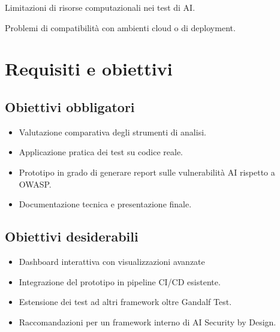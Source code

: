 \begin{risk}{Limitazioni di risorse computazionali nei test di AI.}
\end{risk}

\begin{risk}{Problemi di compatibilità con ambienti cloud o di deployment.}
\end{risk}


\section{Requisiti e obiettivi}


\subsection{Obiettivi obbligatori}
\begin{itemize}
\item Valutazione comparativa degli strumenti di analisi.
\item Applicazione pratica dei test su codice reale.
\item Prototipo in grado di generare report sulle vulnerabilità AI rispetto a OWASP.
\item Documentazione tecnica e presentazione finale.
\end{itemize}

\subsection{Obiettivi desiderabili}
\begin{itemize}
\item Dashboard interattiva con visualizzazioni avanzate
\item Integrazione del prototipo in pipeline CI/CD esistente.
\item Estensione dei test ad altri framework oltre Gandalf Test.
\item Raccomandazioni per un framework interno di AI Security by Design.
\end{itemize}

